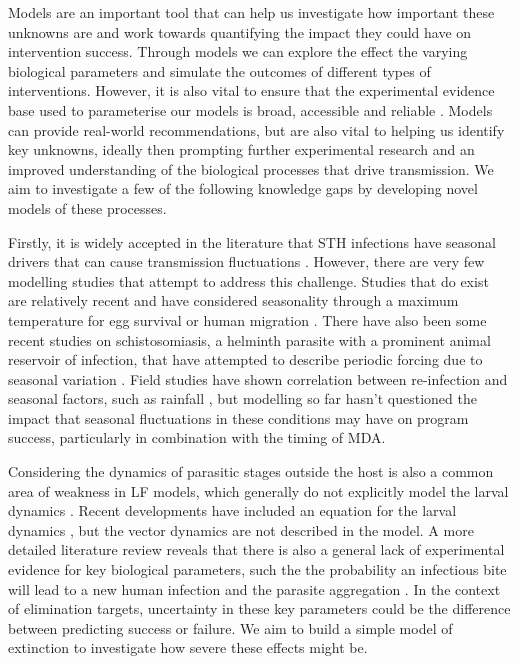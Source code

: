 Models are an important tool that can help us investigate how important these unknowns are and work towards quantifying the impact they could have on intervention success. Through models we can explore the effect the varying biological parameters and simulate the outcomes of different types of interventions. However, it is also vital to ensure that the experimental evidence base used to parameterise our models is broad, accessible and reliable \cite{Davis2019}. Models can provide real-world recommendations, but are also vital to helping us identify key unknowns, ideally then prompting further experimental research and an improved understanding of the biological processes that drive transmission. We aim to investigate a few of the following knowledge gaps by developing novel models of these processes.

Firstly, it is widely accepted in the literature that STH infections have seasonal drivers that can cause transmission fluctuations \cite{Katakam2016,Mekonnen2019,Abubakari2018}. However, there are very few modelling studies that attempt to address this challenge. Studies that do exist are relatively recent and have considered seasonality through a maximum temperature for egg survival \cite{Truscott2016} or human migration \cite{Vegvari2019}. There have also been some recent studies on schistosomiasis, a helminth parasite with a prominent animal reservoir of infection, that have attempted to describe periodic forcing due to seasonal variation \cite{LiTeng2017,Huang2019,Gao2017}. Field studies have shown correlation between re-infection and seasonal factors, such as rainfall \cite{Gunawardena}, but modelling so far hasn't questioned the impact that seasonal fluctuations in these conditions may have on program success, particularly in combination with the timing of MDA. 

Considering the dynamics of parasitic stages outside the host is also a common area of weakness in LF models, which generally do not explicitly model the larval dynamics \cite{Chan1998,Plaisier1998}. Recent developments have included an equation for the larval dynamics \cite{irvine2015,Norman2000_epifil}, but the vector dynamics are not described in the model. A more detailed literature review reveals that there is also a general lack of experimental evidence for key biological parameters, such the the probability an infectious bite will lead to a new human infection \cite{Hairston1968,Jones2014} and the parasite aggregation \cite{Irvine2017_Mosquitobite}. In the context of elimination targets, uncertainty in these key parameters could be the difference between predicting success or failure. We aim to build a simple model of extinction to investigate how severe these effects might be.

